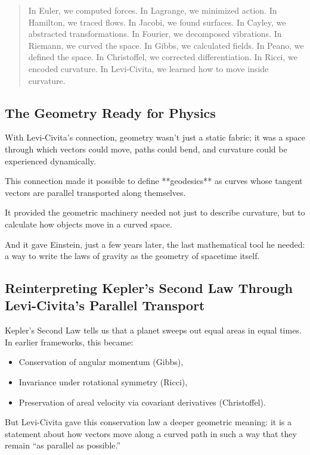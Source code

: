 \bigskip

\begin{quote}
In Euler, we computed forces.  
In Lagrange, we minimized action.  
In Hamilton, we traced flows.  
In Jacobi, we found surfaces.  
In Cayley, we abstracted transformations.  
In Fourier, we decomposed vibrations.  
In Riemann, we curved the space.  
In Gibbs, we calculated fields.  
In Peano, we defined the space.  
In Christoffel, we corrected differentiation.  
In Ricci, we encoded curvature.  
In Levi-Civita, we learned how to move inside curvature.
\end{quote}

\subsection*{The Geometry Ready for Physics}

With Levi-Civita’s connection, geometry wasn’t just a static fabric;  
it was a space through which vectors could move, paths could bend, and curvature could be experienced dynamically.

This connection made it possible to define **geodesics** as curves whose tangent vectors are parallel transported along themselves.

It provided the geometric machinery needed not just to describe curvature,  
but to calculate how objects move in a curved space.

And it gave Einstein, just a few years later, the last mathematical tool he needed:  
a way to write the laws of gravity as the geometry of spacetime itself.


\subsection*{Reinterpreting Kepler’s Second Law Through Levi-Civita’s Parallel Transport}

Kepler’s Second Law tells us that a planet sweeps out equal areas in equal times.  
In earlier frameworks, this became:

\begin{itemize}
    \item Conservation of angular momentum (Gibbs),
    \item Invariance under rotational symmetry (Ricci),
    \item Preservation of areal velocity via covariant derivatives (Christoffel).
\end{itemize}

But Levi-Civita gave this conservation law a deeper geometric meaning:  
it is a statement about how vectors move along a curved path in such a way that they remain “as parallel as possible.”

